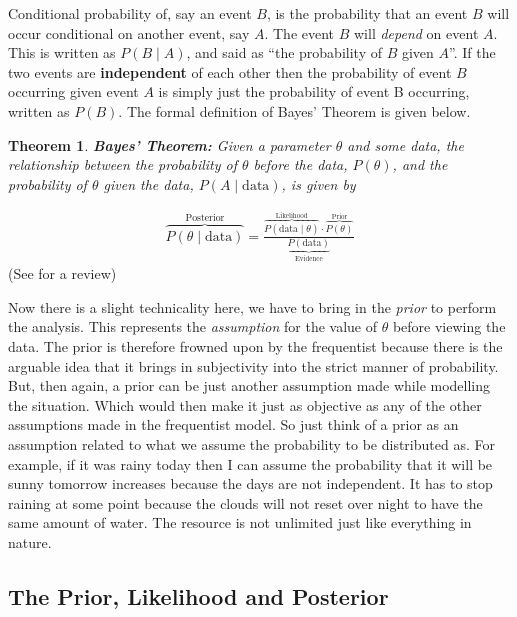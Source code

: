 \documentclass[12pt,twoside]{report}   %
\newcommand{\bb}{\textbf}
\newcommand{\ti}{\textit}
\newtheorem{theorem}{Theorem}[section]
\begin{document}
Conditional probability of, say an event $B$, is the probability that an event $B$ will occur conditional on another event, say $A$. The event $B$ will \ti{depend} on event $A$. This is written as $P(B\mid A)$, and said as ``the probability of $B$ given $A$''. If the two events are \textbf{independent} of each other then the probability of event $B$ occurring given event $A$ is simply just the probability of event B occurring, written as $P(B)$. The formal definition of Bayes' Theorem is given below.
\vspace{7pt}
\begin{theorem}
\bb{Bayes' Theorem:} Given a parameter $\theta$ and some data, the relationship between the probability of $\theta$ before the data, $P(\theta)$, and the probability of $\theta$ given the data, $P(A\mid \text{data})$, is given by
\end{theorem}
\begin{align}
\overbrace{P(\theta\mid \text{data})}^\text{Posterior} = \frac{\overbrace{P(\text{data}\mid \theta)}^\text{Likelihood}\cdot\overbrace{P(\theta)}^\text{Prior}}{\underbrace{P(\text{data})}_\text{Evidence}}\label{1.1}
\end{align}
(See \cite{1} for a review)

Now there is a slight technicality here, we have to bring in the \textit{prior} to perform the analysis. This represents the \textit{assumption} for the value of $\theta$ before viewing the data. The prior is therefore frowned upon by the frequentist because there is the arguable idea that it brings in subjectivity into the strict manner of probability. But, then again, a prior can be just another assumption made while modelling the situation. Which would then make it just as objective as any of the other assumptions made in the frequentist model. So just think of a prior as an assumption related to what we assume the probability to be distributed as. For example, if it was rainy today then I can assume the probability that it will be sunny tomorrow increases because the days are not independent. It has to stop raining at some point because the clouds will not reset over night to have the same amount of water. The resource is not unlimited just like everything in nature.

\subsection{The Prior, Likelihood and Posterior}\label{The Prior, Likelihood and Posterior}
\vspace{-0.35in}
\underline{\hspace{6.2in}}
\vspace{-0.1in}
\end{document}
